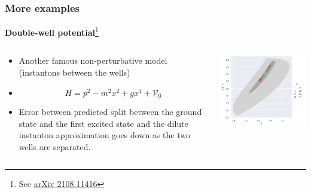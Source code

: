 \documentclass{beamer}
\begin{document}
\begin{frame}
\frametitle{More examples}

\textbf{Double-well potential}\footnote{See \href{https://arxiv.org/abs/2108.11416}{arXiv 2108.11416}}

\begin{columns}
    \begin{column}{0.5\textwidth}
        \begin{itemize}
            \item Another famous non-perturbative model (instantons between the wells)
            \item \begin{equation}
                H=p^{2}-m^{2} x^{2}+g x^{4}+\mathcal{V}_{0}
            \end{equation}
            \item Error between predicted split between the ground state and the first excited state and the dilute instanton approximation goes down as the two wells are separated.
        \end{itemize}
    \end{column}
    \begin{column}{0.5\textwidth}
        \includegraphics[width=\textwidth]{double-well-bootstrap-feasible-domain.png}
    \end{column}
\end{columns}

\end{frame}
\end{document}
